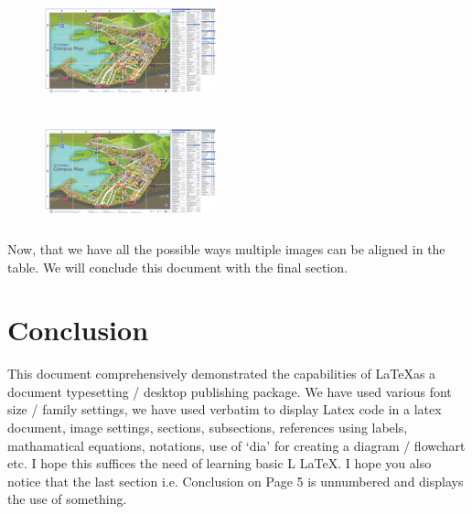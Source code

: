 \documentclass[11pt,a4paper]{article}
\begin{document}
\begin{figure}[h!]
\centering
\parbox{5cm}{
\includegraphics[width=5cm, height=3cm]{img4.jpg}
\centering
\label{fig:2figsA}}
\begin{minipage}{5cm}
\includegraphics[width=5cm, height=3cm]{img4.jpg}   
\centering
\label{fig:2figsB}
\end{minipage}
\end{figure}
\bigbreak
\quad Now, that we have all the possible ways multiple images can be aligned in the table. We will conclude this document with the final section.
\newpage
\section*{Conclusion}
\bigbreak
This document comprehensively demonstrated the capabilities of \LaTeX{}as
a document typesetting / desktop publishing package. We have used
various font size / family settings, we have used verbatim to display
Latex code in a latex document, image settings, sections, subsections,
references using labels, mathamatical equations, notations, use of ‘dia’
for creating a diagram / flowchart etc. I hope this suffices the need
of learning basic L \LaTeX{}. I hope you also notice that the last section i.e.
Conclusion on Page 5 is unnumbered and displays the use of something.
\bigbreak

\printbibliography
\end{document}
